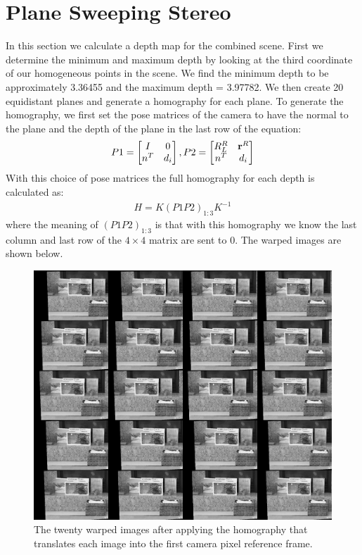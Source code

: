 \documentclass[a4paper]{article}
\begin{document}
\section{Plane Sweeping Stereo}
In this section we calculate a depth map for the combined scene.  First we determine the minimum and maximum depth by looking at the third coordinate of our homogeneous points in the scene.  We find the minimum depth to be approximately 3.36455 and the maximum depth = 3.97782.  We then create 20 equidistant planes and generate a homography for each plane. To generate the homography, we first set the pose matrices of the camera to have the normal to the plane and the depth of the plane in the last row of the equation:
\begin{align*}
	P1 = \begin{bmatrix}
		I & 0\\
		n^T & d_i
		\end{bmatrix}, 
	P2 = \begin{bmatrix}
		R_L^R& {\bf r}^R\\
		n^T & d_i
		\end{bmatrix}
\end{align*}
With this choice of pose matrices the full homography for each depth is calculated as:
\begin{align*}
H = K \left ( P1 P2 \right )_{1:3} K^{-1}
\end{align*}
where the meaning of $\left ( P1 P2 \right )_{1:3}$ is that with this homography we know the last column and last row of the $4 \times 4$ matrix are sent to 0.  The warped images are shown below.
 \begin{figure}[htb!]
    \includegraphics[width=\textwidth]{../ImagesWarping}
    \caption{The twenty warped images after applying the homography that translates each image into the first camera pixel reference frame.}
    \label{fig:reproj}
\end{figure}
\end{document}
